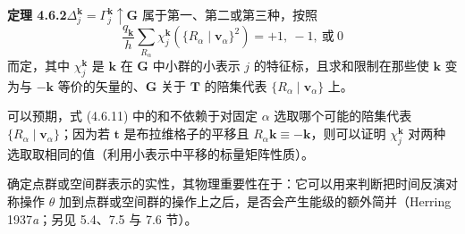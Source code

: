 \noindent\textbf{定理 4.6.2}\quad $\Delta^{\mathbf{k}}_{j} = \Gamma^{\mathbf{k}}_{j} \uparrow \mathbf{G}$ 属于第一、第二或第三种，按照
\begin{equation*}
\frac{q_{\mathbf{k}}}{h}\sum_{R_{\alpha}}\chi^{\mathbf{k}}_{j}\left(\{R_{\alpha} \mid \mathbf{v}_{\alpha}\}^{2}\right) = +1,\ -1,\ \text{或}\ 0
\tag{4.6.11}
\end{equation*}
而定，其中 $\chi^{\mathbf{k}}_{j}$ 是 $\mathbf{k}$ 在 $\mathbf{G}$ 中小群的小表示 $j$ 的特征标，且求和限制在那些使 $\mathbf{k}$ 变为与 $-\mathbf{k}$ 等价的矢量的、$\mathbf{G}$ 关于 $\mathbf{T}$ 的陪集代表 $\{R_{\alpha} \mid \mathbf{v}_{\alpha}\}$ 上。

可以预期，式 (4.6.11) 中的和不依赖于对固定 $\alpha$ 选取哪个可能的陪集代表 $\{R_{\alpha} \mid \mathbf{v}_{\alpha}\}$；因为若 $\mathbf{t}$ 是布拉维格子的平移且 $R_{\alpha}\mathbf{k} \equiv -\mathbf{k}$，则可以证明 $\chi^{\mathbf{k}}_{j}$ 对两种选取取相同的值（利用小表示中平移的标量矩阵性质）。

确定点群或空间群表示的实性，其物理重要性在于：它可以用来判断把时间反演对称操作 $\theta$ 加到点群或空间群的操作上之后，是否会产生能级的额外简并（Herring 1937\textit{a}；另见 5.4、7.5 与 7.6 节）。

